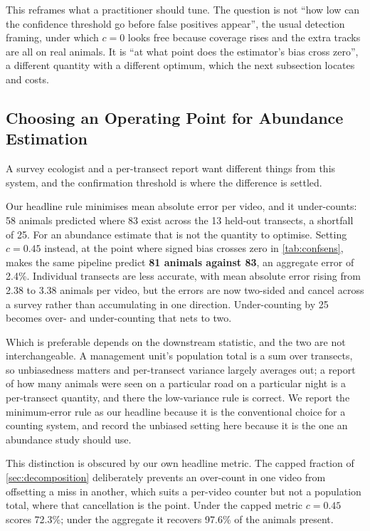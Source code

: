 This reframes what a practitioner should tune. The question is not ``how low can the
confidence threshold go before false positives appear'', the usual detection framing, under
which $c=0$ looks free because coverage rises and the extra tracks are all on real animals. It
is ``at what point does the estimator's bias cross zero'', a different quantity with a
different optimum, which the next subsection locates and costs.

\subsection{Choosing an Operating Point for Abundance Estimation}
\label{sec:operating}

A survey ecologist and a per-transect report want different things from this system, and the
confirmation threshold is where the difference is settled.

Our headline rule minimises mean absolute error per video, and it under-counts: 58 animals
predicted where 83 exist across the 13 held-out transects, a shortfall of 25. For an abundance estimate that is not the quantity to optimise. Setting $c=0.45$ instead, at the point where signed bias crosses zero in \cref{tab:confsens}, makes the same pipeline predict \textbf{81 animals against 83}, an aggregate error of 2.4\%. Individual transects are
less accurate, with mean absolute error rising from 2.38 to 3.38 animals per video, but the
errors are now two-sided and cancel across a survey rather than accumulating in one direction.
Under-counting by 25 becomes over- and under-counting that nets to two.

Which is preferable depends on the downstream statistic, and the two are not
interchangeable. A management unit's population total is a sum over transects, so unbiasedness
matters and per-transect variance largely averages out; a report of how many animals were seen
on a particular road on a particular night is a per-transect quantity, and there the
low-variance rule is correct. We report the minimum-error rule as our headline because it is
the conventional choice for a counting system, and record the unbiased setting here because it
is the one an abundance study should use.

This distinction is obscured by our own headline metric. The capped fraction of
\cref{sec:decomposition} deliberately prevents an over-count in one video from offsetting a
miss in another, which suits a per-video counter but not a population total, where that cancellation is the point. Under the capped metric $c=0.45$ scores
72.3\%; under the aggregate it recovers 97.6\% of the animals present.

